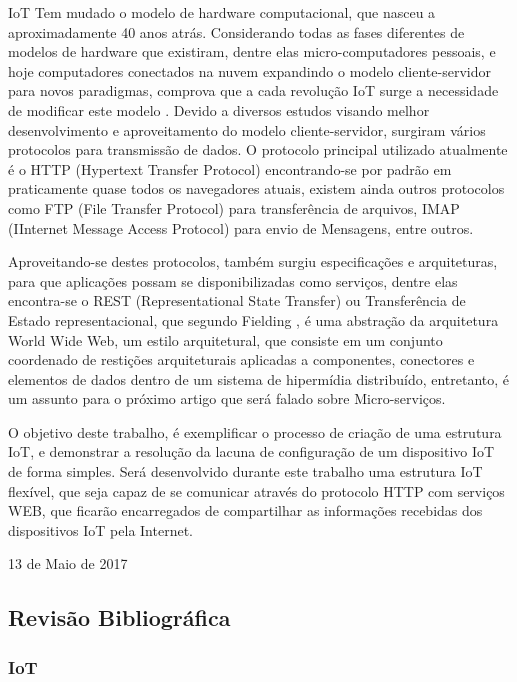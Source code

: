 \documentclass[journal]{IEEEtran}
\begin{document}
IoT Tem mudado o modelo de hardware computacional, que nasceu a aproximadamente 40 anos atrás. Considerando todas as fases diferentes de modelos de hardware que existiram, dentre elas micro-computadores pessoais, e hoje computadores conectados na nuvem expandindo o modelo cliente-servidor para novos paradigmas, comprova que a cada revolução IoT surge a necessidade de modificar este modelo \cite[p.~6]{dzonevoltreeiot}. Devido a diversos estudos visando melhor desenvolvimento e aproveitamento do modelo cliente-servidor, surgiram vários protocolos para transmissão de dados. O protocolo principal utilizado atualmente é o HTTP (Hypertext Transfer Protocol) encontrando-se por padrão em praticamente quase todos os navegadores atuais, existem ainda outros protocolos como FTP (File Transfer Protocol) para transferência de arquivos, IMAP (IInternet Message Access Protocol) para envio de Mensagens, entre outros. 

Aproveitando-se destes protocolos, também surgiu especificações e arquiteturas, para que aplicações possam se disponibilizadas como serviços, dentre elas encontra-se o REST (Representational State Transfer) ou Transferência de Estado representacional, que segundo Fielding \cite{roythomasfielding2017}, é uma abstração da arquitetura World Wide Web, um estilo  arquitetural, que consiste em um conjunto coordenado de restições arquiteturais aplicadas a componentes, conectores e elementos de dados dentro de um sistema de hipermídia distribuído, entretanto, é um assunto para o próximo artigo que será falado sobre Micro-serviços.

O objetivo deste trabalho, é exemplificar o processo de criação de uma estrutura IoT, e demonstrar a resolução da lacuna de configuração de um dispositivo IoT de forma simples. Será desenvolvido durante este trabalho uma estrutura IoT flexível, que seja capaz de se comunicar através do protocolo HTTP com serviços WEB, que ficarão encarregados de compartilhar as informações recebidas dos dispositivos IoT pela Internet.

\hfill 13 de Maio de 2017



\subsection{Revisão Bibliográfica}
\subsubsection{IoT}
\end{document}
